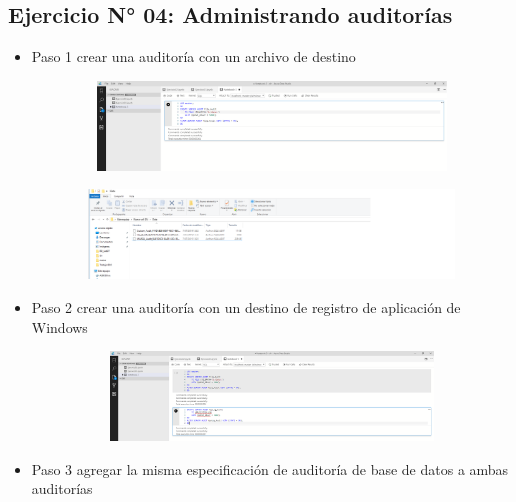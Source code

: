 \subsection{Ejercicio N° 04: Administrando auditorías}
\begin{itemize}


			
			\item Paso 1 crear una auditoría con un archivo de destino
				 
				 	
					\begin{center}
    				\includegraphics[width=16cm, height=90]{./Imagenes/ImagenlV28}
   				    \end{center}
   				    
   				     \begin{center}
    				\includegraphics[width=16cm, height=90]{./Imagenes/AuditoriaCreada3}
   				    \end{center}
   				    
   		   \item Paso 2 crear una auditoría con un destino de registro de aplicación de Windows
				 
				 	
					\begin{center}
    				\includegraphics[width=16cm, height=90]{./Imagenes/ImagenlV29}
   				    \end{center}
   				    
   		   \item Paso 3 agregar la misma especificación de auditoría de base de datos a ambas auditorías
				 

\end{itemize}
